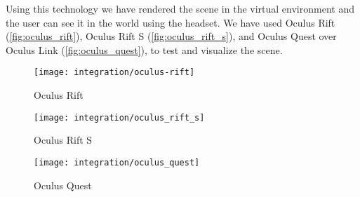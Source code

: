 Using this technology we have rendered the scene in the virtual environment and the user can see it in the  world using the  headset. We have used Oculus Rift (\autoref{fig:oculus_rift}), Oculus Rift S (\autoref{fig:oculus_rift_s}), and Oculus Quest over Oculus Link (\autoref{fig:oculus_quest}), to test and visualize the scene.

\begin{figure}
  \centering
  \texttt{[image: integration/oculus-rift]}
  \caption{Oculus Rift}
  \label{fig:oculus_rift}
\end{figure}

\begin{figure}
  \centering
  \texttt{[image: integration/oculus\_rift\_s]}
  \caption{Oculus Rift S}
  \label{fig:oculus_rift_s}
\end{figure}

\begin{figure}
  \centering
  \texttt{[image: integration/oculus\_quest]}
  \caption{Oculus Quest}
  \label{fig:oculus_quest}
\end{figure}

